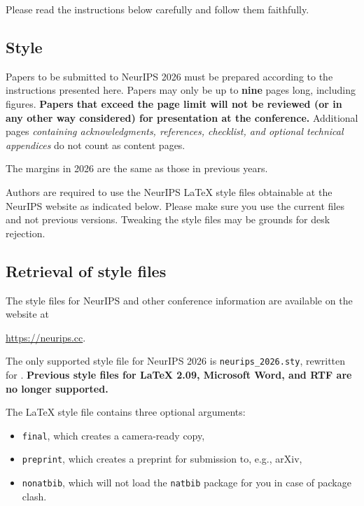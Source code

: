 \documentclass{article}
\begin{document}
Please read the instructions below carefully and follow them faithfully.


\subsection{Style}


Papers to be submitted to NeurIPS 2026 must be prepared according to the
instructions presented here. Papers may only be up to {\bf nine} pages long, including figures. \textbf{Papers that exceed the page limit will not be reviewed (or in any other way considered) for presentation at the conference.}
Additional pages \emph{containing acknowledgments, references, checklist, and optional technical appendices} do not count as content pages. 


The margins in 2026 are the same as those in previous years.


Authors are required to use the NeurIPS \LaTeX{} style files obtainable at the NeurIPS website as indicated below. Please make sure you use the current files and not previous versions. Tweaking the style files may be grounds for desk rejection.


\subsection{Retrieval of style files}


The style files for NeurIPS and other conference information are available on the website at
\begin{center}
  \url{https://neurips.cc}.
\end{center}


The only supported style file for NeurIPS 2026 is \verb+neurips_2026.sty+, rewritten for \LaTeXe{}. \textbf{Previous style files for \LaTeX{} 2.09,  Microsoft Word, and RTF are no longer supported.}


The \LaTeX{} style file contains three optional arguments: 
\begin{itemize}
\item \verb+final+, which creates a camera-ready copy, 
\item \verb+preprint+, which creates a preprint for submission to, e.g., arXiv, \item \verb+nonatbib+, which will not load the \verb+natbib+ package for you in case of package clash.
\end{itemize}
\end{document}

